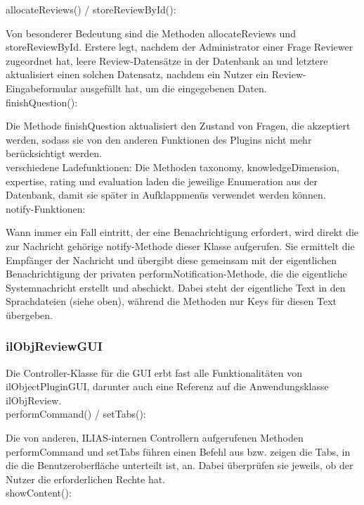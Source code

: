 \documentclass[a4paper]{scrreprt}
\begin{document}
allocateReviews() / storeReviewById():

Von besonderer Bedeutung sind die Methoden allocateReviews und storeReviewById. 
Erstere legt, nachdem der Administrator einer Frage Reviewer zugeordnet hat, leere Review-Datensätze in der Datenbank an und letztere aktualisiert einen solchen Datensatz, nachdem ein Nutzer ein Review-Eingabeformular ausgefüllt hat, um die eingegebenen Daten. \\

finishQuestion():

Die Methode finishQuestion aktualisiert den Zustand von Fragen, die akzeptiert werden, sodass sie von den anderen Funktionen des Plugins nicht mehr berücksichtigt werden.\\
verschiedene Ladefunktionen:
Die Methoden taxonomy, knowledgeDimension, expertise, rating und evaluation laden die jeweilige Enumeration aus der Datenbank, damit sie später in Aufklappmenüs verwendet werden können.\\

notify-Funktionen:

Wann immer ein Fall eintritt, der eine Benachrichtigung erfordert, wird direkt die zur Nachricht gehörige notify-Methode dieser Klasse aufgerufen. 
Sie ermittelt die Empfänger der Nachricht und übergibt diese gemeinsam mit der eigentlichen Benachrichtigung der privaten performNotification-Methode, die die eigentliche Systemnachricht erstellt und abschickt. 
Dabei steht der eigentliche Text in den Sprachdateien (siehe oben), während die Methoden nur Keys für diesen Text übergeben.\\

\subsubsection{ilObjReviewGUI}

Die Controller-Klasse für die GUI erbt fast alle Funktionalitäten von ilObjectPluginGUI, darunter auch eine Referenz auf die Anwendungsklasse ilObjReview. \\

performCommand() / setTabs():

Die von anderen, ILIAS-internen Controllern aufgerufenen Methoden performCommand und setTabs führen einen Befehl aus bzw. zeigen die Tabs, in die die Benutzeroberfläche unterteilt ist, an. 
Dabei überprüfen sie jeweils, ob der Nutzer die erforderlichen Rechte hat.\\

showContent():
\end{document}
